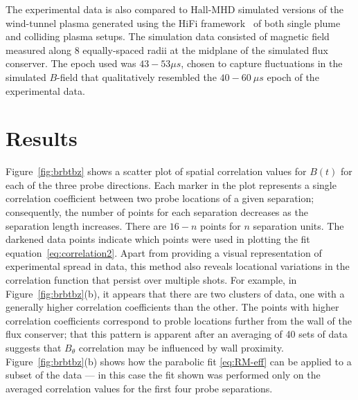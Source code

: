 \documentclass[aip,prl,amsmath,amssymb,reprint,superscriptaddress]{revtex4-1} %
\begin{document}
The experimental data is also compared to Hall-MHD simulated versions of the wind-tunnel plasma generated using the HiFi framework~\cite{schaffner14a} of both single plume and colliding plasma setups. The simulation data consisted of magnetic field measured along 8 equally-spaced radii at the midplane of the simulated flux conserver. The epoch used was $43-53 \mu s$, chosen to capture fluctuations in the simulated $B$-field that qualitatively resembled the $40-60\ \mu s$ epoch of the experimental data. 


\section{Results}

Figure~\ref{fig:brbtbz} shows a scatter plot of spatial correlation values for $B(t)$ for each of the three probe directions. Each marker in the plot represents a single correlation coefficient between two probe locations of a given separation; consequently, the number of points for each separation decreases as the separation length increases. There are $16-n$ points for $n$ separation units. The darkened data points indicate which points were used in plotting the fit equation~\eqref{eq:correlation2}. Apart from providing a visual representation of experimental spread in data, this method also reveals locational variations in the correlation function that persist over multiple shots. For example, in Figure~\ref{fig:brbtbz}(b), it appears that there are two clusters of data, one with a generally higher correlation coefficients than the other. The points with higher correlation coefficients correspond to proble locations further from the wall of the flux conserver; that this pattern is apparent after an averaging of 40 sets of data suggests that $B_\theta$ correlation may be influenced by wall proximity. Figure~\ref{fig:brbtbz}(b) shows how the parabolic fit \eqref{eq:RM-eff} can be applied to a subset of the data --- in this case the fit shown was performed only on the averaged correlation values for the first four probe separations.
\end{document}
